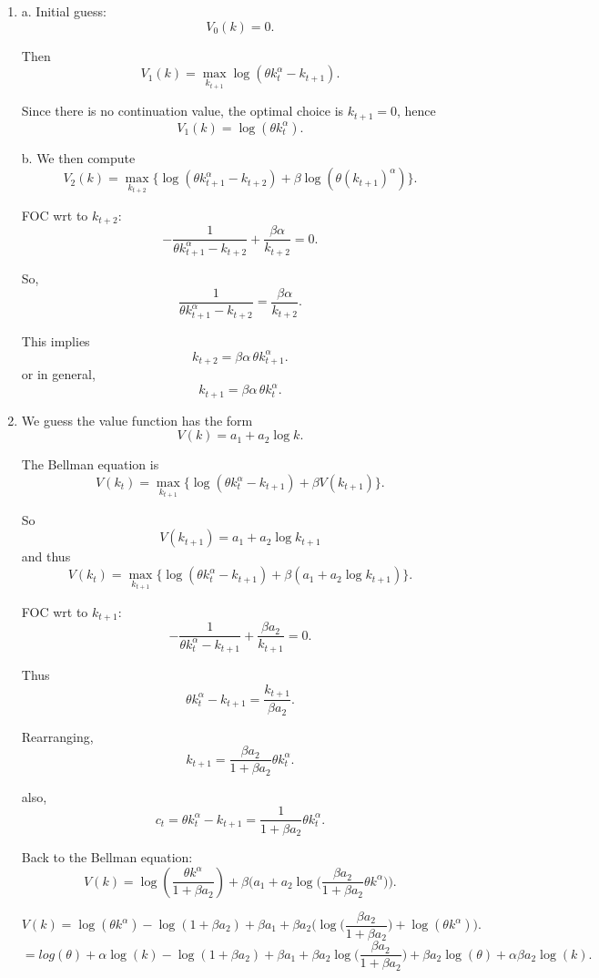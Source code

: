 \documentclass[12pt]{article}
\begin{document}
\begin{enumerate}[label=\textbf{Question \arabic*:}, leftmargin=*, align=left]
    \item  

a. Initial guess:
\[
V_0(k) = 0.
\]

Then
\[
V_1(k) = \max_{k_{t+1}} \log(\theta k_{t}^\alpha - k_{t+1}).
\]

Since there is no continuation value, the optimal choice is $k_{t+1}=0$, hence
\[
V_1(k) = \log(\theta k_{t}^\alpha).
\]


b. We then compute
\[
V_2(k) = \max_{k_{t+2}} \Big\{ \log(\theta k_{t+1}^\alpha - k_{t+2}) + \beta \log(\theta (k_{t+1})^\alpha) \Big\}.
\]

FOC wrt to $k_{t+2}$:
\[
-\frac{1}{\theta k_{t+1}^\alpha - k_{t+2}} + \frac{\beta \alpha}{k_{t+2}} = 0.
\]


So,
\[
\frac{1}{\theta k_{t+1}^\alpha - k_{t+2}} = \frac{\beta \alpha}{k_{t+2}}.
\]

This implies
\[
k_{t+2} = \beta \alpha \, \theta k_{t+1}^\alpha.
\]
or in general,
\[
k_{t+1} = \beta \alpha \, \theta k_{t}^\alpha.
\]

    \item 
   We guess the value function has the form
\[
V(k) = a_1 + a_2 \log k.
\]

The Bellman equation is
\[
V(k_t) = \max_{k_{t+1}} \Big\{ \log(\theta k_t^\alpha - k_{t+1}) + \beta V(k_{t+1}) \Big\}.
\]

So
\[
V(k_{t+1}) = a_1 + a_2 \log k_{t+1}
\]
and thus 
\[
V(k_t) = \max_{k_{t+1}} \Big\{ \log(\theta k_t^\alpha - k_{t+1}) + \beta (a_1 + a_2 \log k_{t+1}) \Big\}.
\]

FOC wrt to $k_{t+1}$:
\[
-\frac{1}{\theta k_t^\alpha - k_{t+1}} + \frac{\beta a_2}{k_{t+1}} = 0.
\]

Thus
\[
\theta k_t^\alpha - k_{t+1} = \frac{k_{t+1}}{\beta a_2}.
\]

Rearranging,
\[
k_{t+1} = \frac{\beta a_2}{1+\beta a_2} \theta k_t^\alpha.
\]

also,
\[
c_t = \theta k_t^\alpha - k_{t+1} = \frac{1}{1+\beta a_2} \theta k_t^\alpha.
\]

Back to the Bellman equation:
\[
V(k) = \log\left( \frac{\theta k^\alpha}{1+\beta a_2} \right)
+ \beta \Big( a_1 + a_2 \log\Big( \frac{\beta a_2}{1+\beta a_2}\theta k^\alpha \Big) \Big).
\]

\[
V(k) = \log(\theta k^\alpha) - \log(1+\beta a_2)
+ \beta a_1 + \beta a_2 \Big( \log\Big(\frac{\beta a_2}{1+\beta a_2}\Big) + \log(\theta k^\alpha) \Big).
\]
\[
= log(\theta) + \alpha \log(k) - \log(1+\beta a_2) + \beta a_1 + \beta a_2 \log\Big(\frac{\beta a_2}{1+\beta a_2}\Big) + \beta a_2 \log(\theta) + \alpha \beta a_2 \log(k).
\]



\end{enumerate}
\end{document}
